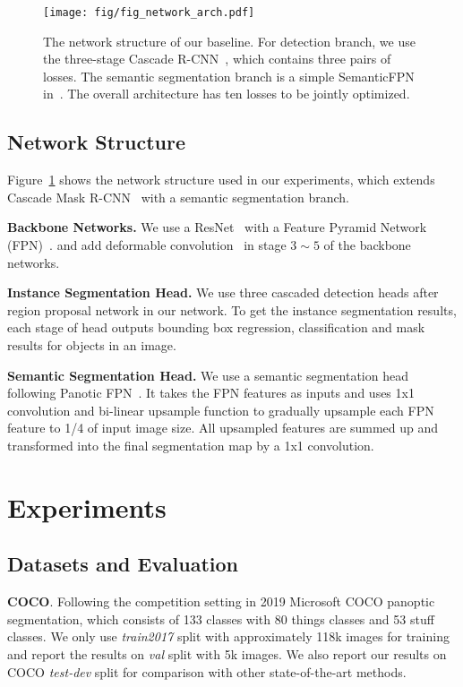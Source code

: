 \documentclass[letterpaper]{article} \usepackage{aaai21}  \usepackage{times}  \usepackage{helvet} \usepackage{courier}  \usepackage[hyphens]{url}  \usepackage{graphicx} \urlstyle{rm} \def\UrlFont{\rm}  \usepackage{natbib}  \usepackage{caption} \frenchspacing  \setlength{\pdfpagewidth}{8.5in}  \setlength{\pdfpageheight}{11in}
\begin{document}
 \begin{figure}[t]
  \centering
  \texttt{[image: fig/fig\_network\_arch.pdf]}
\caption{The network structure of our baseline. For detection branch, we use the three-stage  
  Cascade R-CNN~\cite{cai2017cascade}, which contains three pairs of losses. 
  The semantic segmentation branch is a simple SemanticFPN in~\cite{panopticFPNkirillov2019}. 
  The overall architecture has ten losses to be jointly optimized. }
  \label{fig:network_structure}
\end{figure}

 \subsection{Network Structure}
 \label{subsec:Network-Structure.}
 
 Figure~\ref{fig:network_structure} shows the network structure used in our experiments,
 which extends Cascade Mask R-CNN~\cite{cai2017cascade} with a semantic segmentation branch.


 \noindent
 \textbf{Backbone Networks.} 
 We use a ResNet~\cite{resnetHe2015}
 with a Feature Pyramid Network (FPN)~\cite{fpnlin2017}. 
 and add deformable convolution~\cite{dai2017deformable} 
 in stage $3\sim5$ of the backbone networks.
 
 \noindent
 \textbf{Instance Segmentation Head.} 
 We use three cascaded detection heads after region proposal network 
 in our network. 
 To get the instance segmentation results, each stage of head outputs bounding box regression, 
 classification and mask results for objects in an image. 


 \noindent
 \textbf{Semantic Segmentation Head.} 
 We use a semantic segmentation head following Panotic FPN~\cite{panopticFPNkirillov2019}.
 It takes the FPN features as inputs and uses 1x1 convolution and bi-linear upsample 
 function to gradually upsample each FPN feature to 1/4 of input image size.
All upsampled features are summed up and transformed into the final segmentation map 
 by a 1x1 convolution.








 \section{Experiments}
\label{sec:exp}

 \subsection{Datasets and Evaluation}
 \noindent
 \textbf{COCO}. Following the competition setting in 2019 Microsoft COCO panoptic segmentation, 
 which consists of 133 classes with 80 things classes and 53 stuff classes. We only use \textit{train2017} 
 split with approximately 118k images for training and report the results on \textit{val} split 
 with 5k images. We also report our results on COCO \textit{test-dev} split for comparison 
 with other state-of-the-art methods.
 
\end{document}
